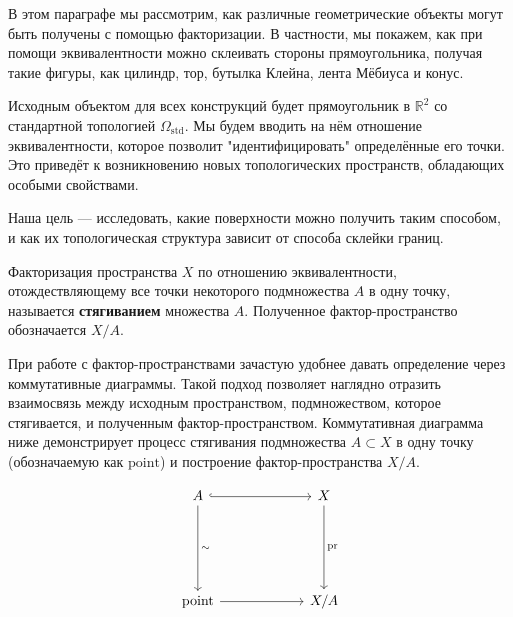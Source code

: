 В этом параграфе мы рассмотрим, как различные геометрические объекты могут быть получены с помощью факторизации. В частности, мы покажем, как при помощи эквивалентности можно склеивать стороны прямоугольника, получая такие фигуры, как цилиндр, тор, бутылка Клейна, лента Мёбиуса и конус.

Исходным объектом для всех конструкций будет прямоугольник в \( \mathbb{R}^2 \) со стандартной топологией \( \Omega_{\mathrm{std}} \). Мы будем вводить на нём отношение эквивалентности, которое позволит "идентифицировать" определённые его точки. Это приведёт к возникновению новых топологических пространств, обладающих особыми свойствами. 

Наша цель — исследовать, какие поверхности можно получить таким способом, и как их топологическая структура зависит от способа склейки границ.

\begin{definition}[Стягивание]
    Факторизация пространства \( X \) по отношению эквивалентности, отождествляющему все точки некоторого подмножества \( A \) в одну точку, называется \textbf{стягиванием} множества \( A \). Полученное фактор-пространство обозначается \( X/A \).
\end{definition}

При работе с фактор-пространствами зачастую удобнее давать определение через коммутативные диаграммы. Такой подход позволяет наглядно отразить взаимосвязь между исходным пространством, подмножеством, которое стягивается, и полученным фактор-пространством. Коммутативная диаграмма ниже демонстрирует процесс стягивания подмножества $ A \subset X $ в одну точку (обозначаемую как $\mathrm{point}$) и построение фактор-пространства $ X/A $.

\begin{center}
    \[
    \begin{tikzcd}[row sep=60pt, column sep=60pt, scale=1]
        A \arrow[r, hook] \arrow{d}{\sim} & X \arrow{d}{\mathrm{pr}} \\
        \mathrm{point} \arrow{r} & X/A
    \end{tikzcd}
    \]
\end{center}

